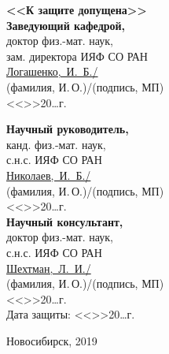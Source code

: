 \documentclass[a4paper,11pt]{extreport}
\begin{document}
\noindent
\vspace*{11pt}
\begin{minipage}[t]{0.5\textwidth}
	\textbf{<<К защите допущена>>} \\			
	\textbf{Заведующий кафедрой,}\\           			
	доктор физ.-мат. наук,\\   			
	зам. директора ИЯФ СО РАН\\            			
	\underline{Логашенко,~И.~Б./\makebox[3cm]{\dotfill}}\\
	\small{(фамилия, И.\,О.)/(подпись, МП)}\\
	\normalsize<<\makebox[0.7cm]{\dotfill}>>\makebox[3cm]{\dotfill}20\dots г.\\
\end{minipage}%
\begin{minipage}[t]{0.5\textwidth}
	\phantom{2cm}\newline
	\textbf{Научный руководитель,} \\
	канд. физ.-мат. наук, \\
	с.н.с. ИЯФ СО РАН\\
	\underline{Николаев,~И.~Б./\makebox[3cm]{\dotfill}}\\
	\small{(фамилия, И.\,О.)/(подпись, МП)}\\
	\normalsize <<\makebox[0.7cm]{\dotfill}>>\makebox[3cm]{\dotfill}20\dots г.\\
	\textbf{Научный консультант,}\\
	доктор физ.-мат. наук, \\
	с.н.с. ИЯФ СО РАН\\
	\underline{Шехтман,~Л.~И./\makebox[3cm]{\dotfill}}\\
	\small{(фамилия, И.\,О.)/(подпись, МП)}\\
	<<\makebox[0.7cm]{\dotfill}>>\makebox[3cm]{\dotfill}20\dots г.\\
	\vspace{11pt}
	\normalsize	Дата защиты: <<\makebox[0.7cm]{\dotfill}>>\makebox[3cm]{\dotfill}20\dots г.
	\vfill
\end{minipage}


\vspace{11pt}


\vfill

\begin{center}
	Новосибирск, 2019
\end{center}
\end{document}
